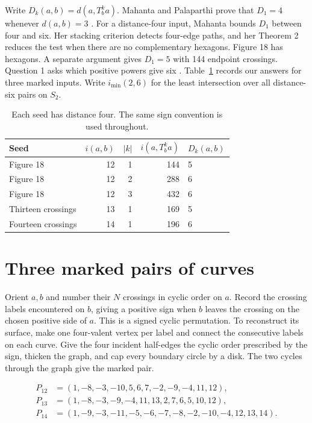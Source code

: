 \documentclass[11pt,a4paper]{article}
\begin{document}
Write \(D_k(a,b)=d(a,T_b^k a)\). Mahanta and Palaparthi prove that
\(D_1=4\) whenever \(d(a,b)=3\) \cite[Theorem 2]{MP}. For a distance-four
input, Mahanta bounds \(D_1\) between four and six. Her stacking criterion
detects four-edge paths, and her Theorem 2 reduces the test when there
are no complementary hexagons. Figure 18 has hexagons. A separate argument
gives \(D_1=5\) with 144 endpoint crossings. Question 1 asks which positive
powers give six \cite[Lemma 9, Theorem 2 and \S6]{M}.
Table~\ref{tab:short} records our answers for three marked inputs. Write
\(i_{\min}(2,6)\) for the least intersection over all distance-six pairs on \(S_2\).

\begin{table}[h]
\centering
\begin{tabular}{lrrrl}
\toprule
Seed & \(i(a,b)\) & \(|k|\) & \(i(a,T_b^k a)\) & \(D_k(a,b)\)\\
\midrule
Figure 18 & 12 & 1 & 144 & 5 \quad\cite[\S6]{M}\\
Figure 18 & 12 & 2 & 288 & 6\\
Figure 18 & 12 & 3 & 432 & 6\\
Thirteen crossings & 13 & 1 & 169 & 5\\
Fourteen crossings & 14 & 1 & 196 & 6\\
\bottomrule
\end{tabular}
\caption{Each seed has distance four. The same sign convention is used
throughout.}\label{tab:short}
\end{table}

\clearpage
\section{Three marked pairs of curves}\label{sec:input}
Orient \(a,b\) and number their \(N\) crossings in cyclic order on \(a\).
Record the crossing labels encountered on \(b\), giving a positive sign
when \(b\) leaves the crossing on the chosen positive side of \(a\).
This is a signed cyclic permutation. To reconstruct its surface, make one
four-valent vertex per label and connect the consecutive labels on each
curve. Give the four incident half-edges the cyclic order prescribed by
the sign, thicken the graph, and cap every boundary circle by a disk.
The two cycles through the graph give the marked pair.

\begin{align*}
P_{12}&=(1,-8,-3,-10,5,6,7,-2,-9,-4,11,12),\\
P_{13}&=(1,-8,-3,-9,-4,11,13,2,7,6,5,10,12),\\
P_{14}&=(1,-9,-3,-11,-5,-6,-7,-8,-2,-10,-4,12,13,14).
\end{align*}
\end{document}
